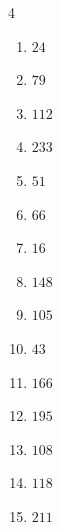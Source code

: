 \begin{multicols}{4}
\begin{enumerate}
  \item $24$


  \item $79$


\columnbreak %

\resetques

  \item $112$


  \item $233$


  \item $51$


  \item $66$


  \item $16$


  \item $148$


  \item $105$


  \item $43$


  \item $166$


  \item $195$


  \item $108$


  \item $118$


  \item $211$



\end{enumerate}
\end{multicols}
